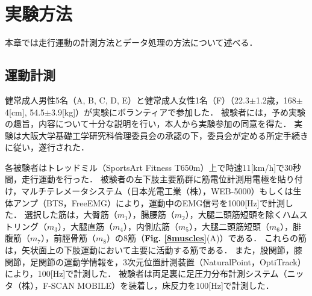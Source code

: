 \section{実験方法}
本章では走行運動の計測方法とデータ処理の方法について述べる．

\subsection{運動計測}
%
%
健常成人男性5名（A, B, C, D, E）と健常成人女性1名（F）（22.3$\pm$1.2歳，168$\pm$4[cm], 54.5$\pm$3.9[kg]）が実験にボランティアで参加した．
被験者には，予め実験の趣旨，内容について十分な説明を行い，本人から実験参加の同意を得た．
実験は大阪大学基礎工学研究科倫理委員会の承認の下，委員会が定める所定手続きに従い，遂行された．

各被験者はトレッドミル（SportsArt Fitness T650m）上で時速11[km/h]で30秒間，走行運動を行った．
被験者の左下肢主要筋群に筋電位計測用電極を貼り付け，マルチテレメータシステム（日本光電工業（株），WEB-5000）もしくは生体アンプ（BTS，FreeEMG）により，運動中のEMG信号を1000[Hz]で計測した．
選択した筋は，大臀筋（$m_1$），腸腰筋（$m_2$），大腿二頭筋短頭を除くハムストリング（$m_3$），大腿直筋（$m_4$），内側広筋（$m_5$），大腿二頭筋短頭（$m_6$），腓腹筋（$m_7$），前脛骨筋（$m_8$）の8筋（{\bf Fig. \ref{8muscles}}(A)）である．
これらの筋は，矢状面上の下肢運動において主要に活動する筋である\cite{Neumann2002}．
また，股関節，膝関節，足関節の運動学情報を，3次元位置計測装置（NaturalPoint，OptiTrack）により，100[Hz]で計測した．
被験者は両足裏に足圧力分布計測システム（ニッタ（株），F-SCAN MOBILE）を装着し，床反力を100[Hz]で計測した．

